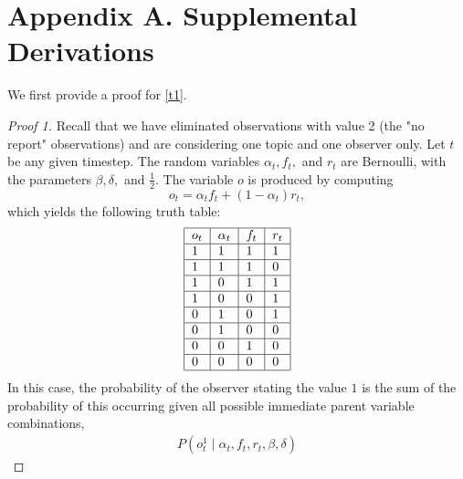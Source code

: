 \documentclass{amsart}
\theoremstyle{plain}
\numberwithin{equation}{section}
\begin{document}
\newpage




\newpage

\section*{Appendix A. Supplemental Derivations}%

We first provide a proof for \autoref{t1}.

\begin{proof}[Proof 1]
\label{A,1}Recall that we have eliminated observations with value 2 (the "no
report" observations) and are considering one topic and one observer only.
Let $t$ be any given timestep. The random variables $\alpha _{t},f_{t},$ and 
$r_{t}$ are Bernoulli, with the parameters $\beta ,\delta ,$ and $\frac{1}{2}
$. The variable $o$ is produced by computing%
\begin{equation*}
o_{t}=\alpha _{t}f_{t}+\left( 1-\alpha _{t}\right) r_{t},
\end{equation*}%
which yields the following truth table:%
\begin{equation*}
\begin{tabular}{|l|l|l|l|}
\hline
$o_{t}$ & $\alpha _{t}$ & $f_{t}$ & $r_{t}$ \\ \hline
$1$ & $1$ & $1$ & $1$ \\ \hline
$1$ & $1$ & $1$ & $0$ \\ \hline
$1$ & $0$ & $1$ & $1$ \\ \hline
$1$ & $0$ & $0$ & $1$ \\ \hline
$0$ & $1$ & $0$ & $1$ \\ \hline
$0$ & $1$ & $0$ & $0$ \\ \hline
$0$ & $0$ & $1$ & $0$ \\ \hline
$0$ & $0$ & $0$ & $0$ \\ \hline
\end{tabular}%
\end{equation*}%
In this case, the probability of the observer stating the value $1$ is the
sum of the probability of this occurring given all possible immediate parent
variable combinations, 
\begin{eqnarray*}
P\left( o_{t}^{1}\mid \alpha _{t},f_{t},r_{t},\beta ,\delta \right) 

\end{eqnarray*}
\end{proof}
\end{document}
